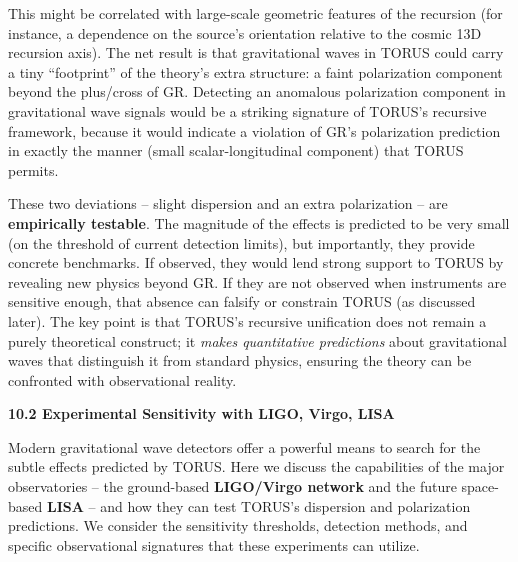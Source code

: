 \documentclass[
]{article}
\begin{document}
\begin{itemize}
  This might be correlated with large-scale geometric features of the
  recursion (for instance, a dependence on the source's orientation
  relative to the cosmic 13D recursion axis)\hspace{0pt}. The net result
  is that gravitational waves in TORUS could carry a tiny ``footprint''
  of the theory's extra structure: a faint polarization component beyond
  the plus/cross of GR. Detecting an anomalous polarization component in
  gravitational wave signals would be a striking signature of TORUS's
  recursive framework, because it would indicate a violation of GR's
  polarization prediction in exactly the manner (small
  scalar-longitudinal component) that TORUS permits\hspace{0pt}.
\end{itemize}

These two deviations -- slight dispersion and an extra polarization --
are \textbf{empirically testable}. The magnitude of the effects is
predicted to be very small (on the threshold of current detection
limits), but importantly, they provide concrete benchmarks. If observed,
they would lend strong support to TORUS by revealing new physics beyond
GR. If they are not observed when instruments are sensitive enough, that
absence can falsify or constrain TORUS (as discussed later). The key
point is that TORUS's recursive unification does not remain a purely
theoretical construct; it \emph{makes quantitative predictions} about
gravitational waves that distinguish it from standard physics, ensuring
the theory can be confronted with observational reality\hspace{0pt}.

\textbf{10.2 Experimental Sensitivity with LIGO, Virgo, LISA}

Modern gravitational wave detectors offer a powerful means to search for
the subtle effects predicted by TORUS. Here we discuss the capabilities
of the major observatories -- the ground-based \textbf{LIGO/Virgo
network} and the future space-based \textbf{LISA} -- and how they can
test TORUS's dispersion and polarization predictions. We consider the
sensitivity thresholds, detection methods, and specific observational
signatures that these experiments can utilize.
\end{document}

